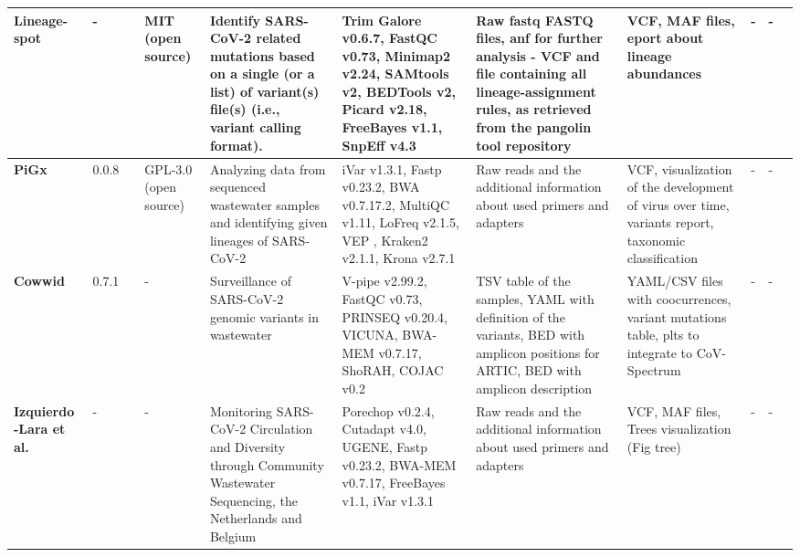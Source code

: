 \begin{landscape}
\begin{table}[ht!]
\begin{tabular}{l|l|l|l|l|l|l|l|l|l|l}
\multicolumn{1}{m{1cm}|}{\textbf{Lineage- spot}}&\multicolumn{1}{m{0.7cm}|}{-}&\multicolumn{1}{m{0.7cm}|}{\cite{pechlivanis2022}}&\multicolumn{1}{m{0.75cm}|}{MIT (open source)}&\multicolumn{1}{m{3cm}|}{Identify SARS-CoV-2 related mutations based on a single (or a list) of variant(s) file(s) (i.e., variant calling format).}&\multicolumn{1}{m{3cm}|}{Trim Galore v0.6.7, FastQC v0.73, Minimap2 v2.24, SAMtools v2, BEDTools v2, Picard v2.18, FreeBayes v1.1, SnpEff v4.3}&\multicolumn{1}{m{3cm}|}{Raw fastq FASTQ files, anf for further analysis - VCF and file containing all lineage-assignment rules, as retrieved from the pangolin tool repository}&\multicolumn{1}{m{3cm}|}{VCF, MAF files, eport about lineage abundances}&\multicolumn{1}{m{1cm}|}{-}&\multicolumn{1}{m{1cm}|}{-}&\multicolumn{1}{m{1cm}}{\cite{pechlivanis2022}}\\ \hline 
\multicolumn{1}{m{1cm}|}{\textbf{PiGx}}&\multicolumn{1}{m{0.7cm}|}{0.0.8}&\multicolumn{1}{m{0.7cm}|}{\cite{schumann2021}}&\multicolumn{1}{m{0.75cm}|}{GPL-3.0 (open source)}&\multicolumn{1}{m{3cm}|}{Analyzing data from sequenced wastewater samples and identifying given lineages of SARS-CoV-2}&\multicolumn{1}{m{3cm}|}{iVar v1.3.1, Fastp v0.23.2, BWA v0.7.17.2, MultiQC v1.11, LoFreq v2.1.5, VEP , Kraken2 v2.1.1, Krona v2.7.1}&\multicolumn{1}{m{3cm}|}{Raw reads and the additional information about used primers and adapters}&\multicolumn{1}{m{3cm}|}{VCF, visualization of the development of virus over time, variants report, taxonomic classification}&\multicolumn{1}{m{1cm}|}{-}&\multicolumn{1}{m{1cm}|}{-}&\multicolumn{1}{m{1cm}}{\cite{schumann2021}}\\ \hline 
\multicolumn{1}{m{1cm}|}{\textbf{Cowwid}}&\multicolumn{1}{m{0.7cm}|}{0.7.1}&\multicolumn{1}{m{0.7cm}|}{\cite{jahn2021}}&\multicolumn{1}{m{0.75cm}|}{-}&\multicolumn{1}{m{3cm}|}{Surveillance of SARS-CoV-2 genomic variants in wastewater}&\multicolumn{1}{m{3cm}|}{V-pipe v2.99.2, FastQC v0.73, PRINSEQ v0.20.4, VICUNA, BWA-MEM v0.7.17, ShoRAH, COJAC v0.2}&\multicolumn{1}{m{3cm}|}{TSV table of the samples, YAML with definition of the variants, BED with amplicon positions for ARTIC, BED with amplicon description}&\multicolumn{1}{m{3cm}|}{YAML/CSV files with coocurrences, variant mutations table, plts to integrate to CoV-Spectrum}&\multicolumn{1}{m{1cm}|}{-}&\multicolumn{1}{m{1cm}|}{-}&\multicolumn{1}{m{1cm}}{\cite{jahn2021,swisscovspectrum}}\\ \hline 
\multicolumn{1}{m{1cm}|}{\textbf{Izquierdo -Lara et al.}}&\multicolumn{1}{m{0.7cm}|}{-}&\multicolumn{1}{m{0.7cm}|}{\cite{izquierdo}}&\multicolumn{1}{m{0.75cm}|}{-}&\multicolumn{1}{m{3cm}|}{Monitoring SARS-CoV-2 Circulation and Diversity through Community Wastewater Sequencing, the Netherlands and Belgium}&\multicolumn{1}{m{3cm}|}{Porechop v0.2.4, Cutadapt v4.0, UGENE, Fastp v0.23.2, BWA-MEM v0.7.17, FreeBayes v1.1, iVar v1.3.1}&\multicolumn{1}{m{3cm}|}{Raw reads and the additional information about used primers and adapters}&\multicolumn{1}{m{3cm}|}{VCF, MAF files, Trees visualization (Fig tree)}&\multicolumn{1}{m{1cm}|}{-}&\multicolumn{1}{m{1cm}|}{-}&\multicolumn{1}{m{1cm}}{\cite{izquierdo}}\\ \hline 

\end{tabular}
\end{table}
\end{landscape}
